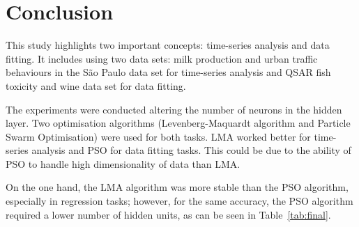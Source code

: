 \begin{table}[htbp]
    \centering
    \caption{Summary of tests performed with PSO for white wine test data set}
    \label{tab:psowhitewine}
    
\end{table}

\section{Conclusion}

This study highlights two important concepts: time-series analysis and data fitting. It includes using two data sets: milk production and urban traffic behaviours in the São Paulo data set for time-series analysis and QSAR fish toxicity and wine data set for data fitting. 

The experiments were conducted altering the number of neurons in the hidden layer. Two optimisation algorithms (Levenberg-Maquardt algorithm and Particle Swarm Optimisation) were used for both tasks. LMA worked better for time-series analysis and PSO for data fitting tasks. This could be due to the ability of PSO to handle high dimensionality of data than LMA. 

On the one hand, the LMA algorithm was more stable than the PSO algorithm, especially in regression tasks; however, for the same accuracy, the PSO algorithm required a lower number of hidden units, as can be seen in Table~\ref{tab:final}.

